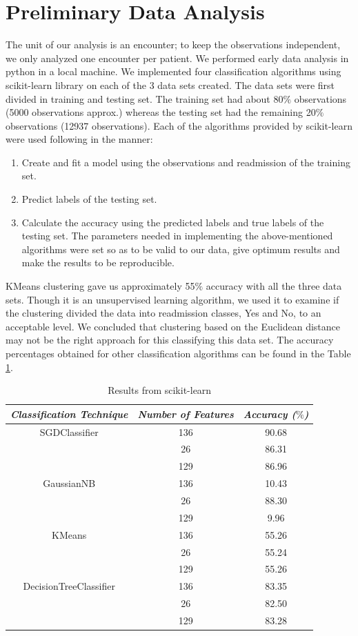 \documentclass[9pt,twocolumn,twoside]{../../styles/osajnl}
\begin{document}
\section{Preliminary Data Analysis}
The unit of our analysis is an encounter; to keep the observations independent, we only analyzed one encounter per patient.
We performed early data analysis in python in a local machine. We implemented four classification algorithms using scikit-learn library on each of the 3 data sets created. The data sets were first divided in training and testing set. The training set had about 80$\%$ observations (5000 observations approx.) whereas the testing set had the remaining 20$\%$ observations (12937 observations). Each of the algorithms provided by scikit-learn were used following in the manner:
\begin{enumerate}
\item Create and fit a model using the observations and readmission of the training set.
\item Predict labels of the testing set.
\item Calculate the accuracy using the predicted labels and true labels of the testing set. The parameters needed in implementing the above-mentioned algorithms were set so as to be valid to our data, give optimum results and make the results to be reproducible.
\end{enumerate}
KMeans clustering gave us approximately 55$\%$ accuracy with all the three data sets.  Though it is an unsupervised learning algorithm, we used it to examine if the clustering divided the data into readmission classes, Yes and No, to an acceptable level. We concluded that clustering based on the Euclidean distance may not be the right approach for this classifying this data set. The accuracy percentages obtained  for other classification algorithms can be found  in the Table \ref{table:sklearn}.

\begin{table}[h!]
\centering
 \begin{tabular}{|c c c|} 
 \hline
 \textit{Classification Technique} & \textit{Number of Features} & \textit{Accuracy ($\%$)}\\ 
 \hline
 \hline 
  SGDClassifier & 136 & 90.68 \\  & 26 & 86.31\\
  & 129 & 86.96\\
 \hline 
  GaussianNB & 136 & 10.43 \\  & 26 & 88.30\\
  & 129 & 9.96\\ 
 \hline 
   KMeans & 136 & 55.26 \\ 
   & 26 & 55.24\\
  & 129 & 55.26\\ 
 \hline 
DecisionTreeClassifier & 136 & 83.35 \\ & 26 & 82.50\\
  & 129 & 83.28\\
\hline 
\end{tabular}
\caption{Results from scikit-learn}
\label{table:sklearn}
\end{table}
\end{document}
